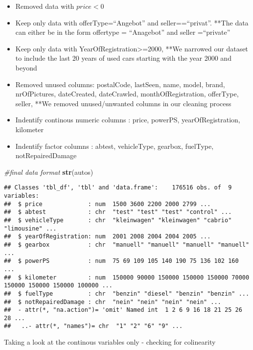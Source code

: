 \documentclass[]{article}
\newenvironment{Shaded}{\begin{snugshade}}{\end{snugshade}}
\newcommand{\CommentTok}[1]{\textcolor[rgb]{0.56,0.35,0.01}{\textit{#1}}}
\newcommand{\KeywordTok}[1]{\textcolor[rgb]{0.13,0.29,0.53}{\textbf{#1}}}
\newcommand{\NormalTok}[1]{#1}
\providecommand{\tightlist}{%
  \setlength{\itemsep}{0pt}\setlength{\parskip}{0pt}}
\begin{document}
\begin{itemize}
\tightlist
\item
  Removed data with \(price < 0\)
\item
  Keep only data with offerType=``Angebot'' and seller==``privat''.
  **The data can either be in the form offertype = ``Anagebot'' and
  seller =``private''
\item
  Keep only data with YearOfRegistration\textgreater{}=2000, **We
  narrowed our dataset to include the last 20 years of used cars
  starting with the year 2000 and beyond
\item
  Removed unused columns: postalCode, lastSeen, name, model, brand,
  nrOfPictures, dateCreated, dateCrawled, monthOfRegistration,
  offerType, seller, **We removed unused/unwanted columns in our
  cleaning process
\item
  Indentify continous numeric columns : price, powerPS,
  yearOfRegistration, kilometer
\item
  Indentify factor columns : abtest, vehicleType, gearbox, fuelType,
  notRepairedDamage
\end{itemize}

\begin{Shaded}
\begin{Highlighting}[]
\CommentTok{#final data format}
\KeywordTok{str}\NormalTok{(autos)}
\end{Highlighting}
\end{Shaded}

\begin{verbatim}
## Classes 'tbl_df', 'tbl' and 'data.frame':    176516 obs. of  9 variables:
##  $ price             : num  1500 3600 2200 2000 2799 ...
##  $ abtest            : chr  "test" "test" "test" "control" ...
##  $ vehicleType       : chr  "kleinwagen" "kleinwagen" "cabrio" "limousine" ...
##  $ yearOfRegistration: num  2001 2008 2004 2004 2005 ...
##  $ gearbox           : chr  "manuell" "manuell" "manuell" "manuell" ...
##  $ powerPS           : num  75 69 109 105 140 190 75 136 102 160 ...
##  $ kilometer         : num  150000 90000 150000 150000 150000 70000 150000 150000 150000 100000 ...
##  $ fuelType          : chr  "benzin" "diesel" "benzin" "benzin" ...
##  $ notRepairedDamage : chr  "nein" "nein" "nein" "nein" ...
##  - attr(*, "na.action")= 'omit' Named int  1 2 6 9 16 18 21 25 26 28 ...
##   ..- attr(*, "names")= chr  "1" "2" "6" "9" ...
\end{verbatim}

Taking a look at the continous variables only - checking for colinearity
\end{document}
